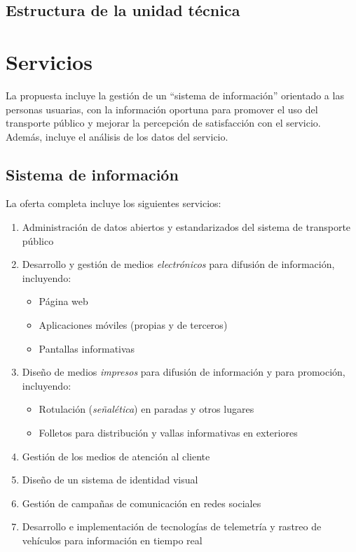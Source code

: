 \documentclass{report}
\begin{document}
\section{Estructura de la unidad técnica}
\label{S:estructura}

\chapter{Servicios}

La propuesta incluye la gestión de un ``sistema de información'' orientado a las personas usuarias, con la información oportuna para promover el uso del transporte público y mejorar la percepción de satisfacción con el servicio. Además, incluye el análisis de los datos del servicio.

\section{Sistema de información}

La oferta completa incluye los siguientes servicios:

\begin{enumerate}[noitemsep]
    \item Administración de datos abiertos y estandarizados del sistema de transporte público
    \item Desarrollo y gestión de medios \textit{electrónicos} para difusión de información, incluyendo:
    \begin{itemize}
        \item Página web
        \item Aplicaciones móviles (propias y de terceros)
        \item Pantallas informativas
    \end{itemize}
    \item Diseño de medios \textit{impresos} para difusión de información y para promoción, incluyendo:
    \begin{itemize}
        \item Rotulación (\textit{señalética}) en paradas y otros lugares
        \item Folletos para distribución y vallas informativas en exteriores
    \end{itemize}
    \item Gestión de los medios de atención al cliente
    \item Diseño de un sistema de identidad visual
    \item Gestión de campañas de comunicación en redes sociales
    \item Desarrollo e implementación de tecnologías de telemetría y rastreo de vehículos para información en tiempo real
\end{enumerate}
\end{document}
